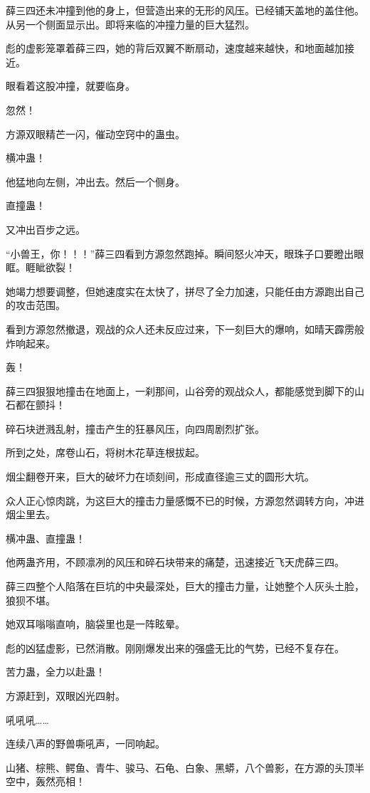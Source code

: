 \begin{this_body}
薛三四还未冲撞到他的身上，但营造出来的无形的风压。已经铺天盖地的盖住他。从另一个侧面显示出。即将来临的冲撞力量的巨大猛烈。

彪的虚影笼罩着薛三四，她的背后双翼不断扇动，速度越来越快，和地面越加接近。

眼看着这股冲撞，就要临身。

忽然！

方源双眼精芒一闪，催动空窍中的蛊虫。

横冲蛊！

他猛地向左侧，冲出去。然后一个侧身。

直撞蛊！

又冲出百步之远。

“小兽王，你！！！”薛三四看到方源忽然跑掉。瞬间怒火冲天，眼珠子口要瞪出眼眶。睚眦欲裂！

她竭力想要调整，但她速度实在太快了，拼尽了全力加速，只能任由方源跑出自己的攻击范围。

看到方源忽然撤退，观战的众人还未反应过来，下一刻巨大的爆响，如晴天霹雳般炸响起来。

轰！

薛三四狠狠地撞击在地面上，一刹那间，山谷旁的观战众人，都能感觉到脚下的山石都在颤抖！

碎石块迸溅乱射，撞击产生的狂暴风压，向四周剧烈扩张。

所到之处，席卷山石，将树木花草连根拔起。

烟尘翻卷开来，巨大的破坏力在顷刻间，形成直径逾三丈的圆形大坑。

众人正心惊肉跳，为这巨大的撞击力量感慨不已的时候，方源忽然调转方向，冲进烟尘里去。

横冲蛊、直撞蛊！

他两蛊齐用，不顾凛冽的风压和碎石块带来的痛楚，迅速接近飞天虎薛三四。

薛三四整个人陷落在巨坑的中央最深处，巨大的撞击力量，让她整个人灰头土脸，狼狈不堪。

她双耳嗡嗡直响，脑袋里也是一阵眩晕。

彪的凶猛虚影，已然消散。刚刚爆发出来的强盛无比的气势，已经不复存在。

苦力蛊，全力以赴蛊！

方源赶到，双眼凶光四射。

吼吼吼……

连续八声的野兽嘶吼声，一同响起。

山猪、棕熊、鳄鱼、青牛、骏马、石龟、白象、黑蟒，八个兽影，在方源的头顶半空中，轰然亮相！


\end{this_body}
